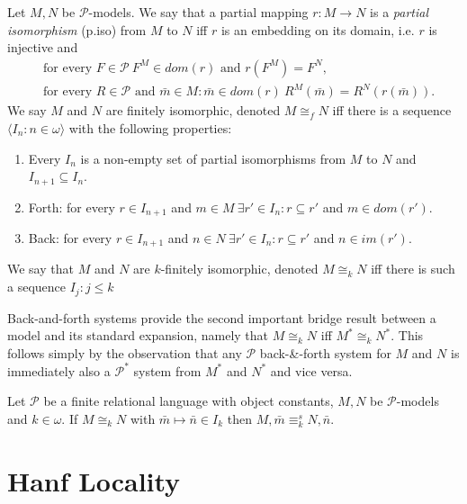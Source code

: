 \documentclass{lmcs} %
\newcommand{\?}{\ensuremath{\mkern0.4\thinmuskip}}
\let\isom=\cong%
\newcommand{\CP}{\mathcal{P}}
\begin{document}
\begin{defi}
    Let $M,N$ be $\CP$-models. We say that a partial mapping $r\colon M\rightarrow N$ is a \textit{partial isomorphism} (p.iso) from $M$ to $N$ iff $r$ is an embedding on its domain, i.e. $r$ is injective and \begin{align*}
        &\text{for every }F\in\CP\ F^M\in dom(r) \text{ and }r(F^M)=F^N,\\
        &\text{for every }R\in\CP \text{ and } \bar{m}\in M:\bar{m}\in dom(r)\ R^M(\bar{m})=R^N(r(\bar{m})).
    \end{align*}
\noindent
    We say $M$ and $N$ are finitely isomorphic, denoted $M\isom_f N$ iff there is a sequence $\langle I_n:n\in\omega\rangle$ with the following properties:\begin{enumerate}
        \item Every $I_n$ is a non-empty set of partial isomorphisms from $M$ to $N$ and $I_{n+1}\subseteq I_n$.
        \item Forth: for every $r\in I_{n+1}$ and $m\in M\ \exists r'\in I_n:r\subseteq r'$ and $m\in dom(r')$.
        \item Back: for every $r\in I_{n+1}$ and $n\in N\ \exists r'\in I_n:r\subseteq r'$ and $n\in im(r')$. 
    \end{enumerate}
    We say that $M$ and $N$ are $k$-finitely isomorphic, denoted $M\isom_k N$ iff there is such a sequence $I_{j}:j\leq k$
\end{defi}
\begin{rem}
    Back-and-forth systems provide the second important bridge result between a model and its standard expansion, namely that $M\isom_k N$ iff $M^\ast\isom_k N^\ast$. This follows simply by the observation that any $\CP$ back-\&-forth system for $M$ and $N$ is immediately also a $\CP^\ast$ system from $M^\ast$ and $N^\ast$ and vice versa.
\end{rem}

\begin{thm}\label{thm:EF}
    Let $\CP$ be a finite relational language with object constants, $M,N$ be $\CP$-models and $k\in\omega$. If $M\isom_k N$ with $\bar{m}\mapsto\bar{n}\in I_k$ then $M,\bar{m}\equiv^s_k N,\bar{n}$.  
\end{thm}



\section{Hanf Locality}\label{sec:Hanf}
\end{document}
